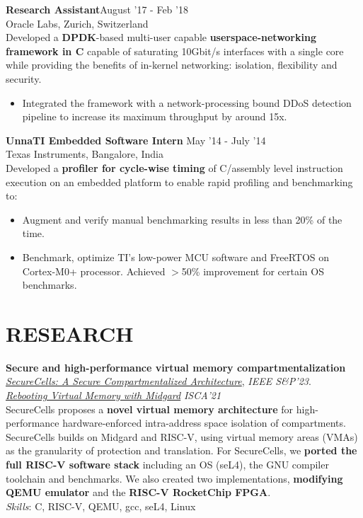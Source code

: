 \documentclass[margin, 10pt]{res} %
\begin{document}
\begin{resume}
{\bf Research Assistant}\hfill August '17 - Feb '18 \\
Oracle Labs, Zurich, Switzerland \\
Developed a {\bf DPDK}-based multi-user capable {\bf userspace-networking framework in C} capable of saturating 10Gbit/s interfaces with a single core while providing the benefits of in-kernel networking: isolation, flexibility and security.
\begin{itemize}
\item Integrated the framework with a network-processing bound DDoS detection pipeline to increase its maximum throughput by around 15x.
\end{itemize}

{\bf UnnaTI Embedded Software Intern} \hfill May '14 - July '14 \\
Texas Instruments, Bangalore, India\\
Developed a {\bf profiler for cycle-wise timing} of C/assembly level instruction execution on an embedded platform to enable rapid profiling and benchmarking to:
\begin{itemize}
\item Augment and verify manual benchmarking results in less than 20\% of the time.
\item Benchmark, optimize TI’s low-power MCU software and FreeRTOS on Cortex-M0+ processor. Achieved $>$50\% improvement for certain OS benchmarks.
\end{itemize} 

\section{RESEARCH}

{\bf Secure and high-performance virtual memory compartmentalization} \\
{\sl \href{https://infoscience.epfl.ch/record/301914/files/seccell.pdf?ln=en}{SecureCells: A Secure Compartmentalized Architecture}}, \hfill \emph{IEEE S\&P'23}. \\
{\sl \href{http://nebelwelt.net/files/21ISCA.pdf}{Rebooting Virtual Memory with Midgard}} \hfill \emph{ISCA'21} \\
SecureCells proposes a {\bf novel virtual memory architecture} for high-performance hardware-enforced intra-address space isolation of compartments.
SecureCells builds on Midgard and RISC-V, using virtual memory areas (VMAs) as the granularity of protection and translation. 
For SecureCells, we {\bf ported the full  RISC-V software stack} including an OS (seL4), the GNU compiler toolchain and benchmarks.
We also created two implementations, {\bf modifying QEMU emulator} and the {\bf RISC-V RocketChip FPGA}.
\\
{\sl Skills}: C, RISC-V, QEMU, gcc, seL4, Linux


\end{resume}
\end{document}

